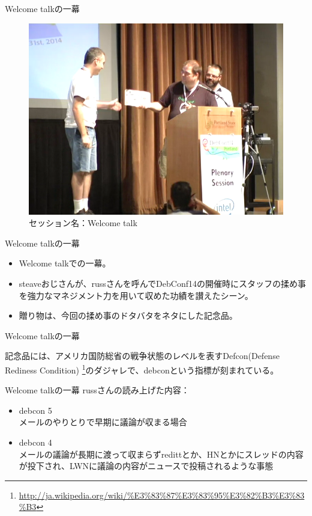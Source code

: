 \begin{frame}{Welcome talkの一幕}

\begin{figure}[H]
\begin{center}
 \includegraphics[width=0.6\hsize]{image201409/welcome.png}
\end{center}
\caption{セッション名：Welcome talk}
\end{figure}
 
\end{frame}

\begin{frame}{Welcome talkの一幕}

\begin{itemize}
 \item Welcome talkでの一幕。
 \item steaveおじさんが、russさんを呼んでDebConf14の開催時にスタッフの揉め事を強力なマネジメント力を用いて収めた功績を讃えたシーン。
 \item 贈り物は、今回の揉め事のドタバタをネタにした記念品。
\end{itemize}

\end{frame}

\begin{frame}{Welcome talkの一幕}

 記念品には、アメリカ国防総省の戦争状態のレベルを表すDefcon(Defense Rediness Condition)
\footnote{\url{http://ja.wikipedia.org/wiki/\%E3\%83\%87\%E3\%83\%95\%E3\%82\%B3\%E3\%83\%B3}}のダジャレで、debconという指標が刻まれている。

\end{frame}

\begin{frame}{Welcome talkの一幕}
russさんの読み上げた内容：

\begin{itemize}
\item debcon 5 \\
 メールのやりとりで早期に議論が収まる場合
\item debcon 4 \\
 メールの議論が長期に渡って収まらずredittとか、HNとかにスレッドの内容が投下され、LWNに議論の内容がニュースで投稿されるような事態
\end{itemize}

\end{frame}

